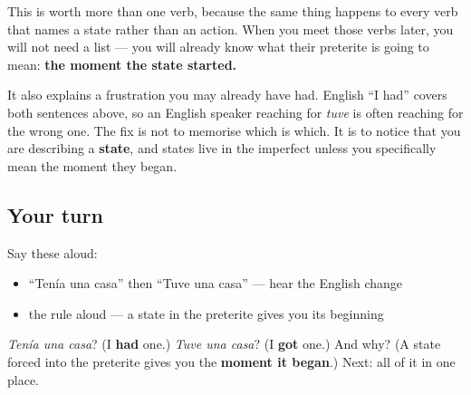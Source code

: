 \begin{culture}
This is worth more than one verb, because the same thing happens to every verb that names a state rather than an action. When you meet those verbs later, you will not need a list — you will already know what their preterite is going to mean: \textbf{the moment the state started.}

It also explains a frustration you may already have had. English \textquotedblleft{}I had\textquotedblright{} covers both sentences above, so an English speaker reaching for \emph{tuve} is often reaching for the wrong one. The fix is not to memorise which is which. It is to notice that you are describing a \textbf{state}, and states live in the imperfect unless you specifically mean the moment they began.
\end{culture}

\subsection*{Your turn}
Say these aloud:

\begin{itemize}
\raggedright
  \item \textquotedblleft{}Tenía una casa\textquotedblright{} then \textquotedblleft{}Tuve una casa\textquotedblright{} — hear the English change
  \item the rule aloud — a state in the preterite gives you its beginning
\end{itemize}

\begin{tcolorbox}[breakable,colback=teal!4,colframe=teal!35!black,title={Before you move on}]
\emph{Tenía una casa}? (I \textbf{had} one.) \emph{Tuve una casa}? (I \textbf{got} one.) And why? (A state forced into the preterite gives you the \textbf{moment it began}.) Next: all of it in one place.
\end{tcolorbox}
